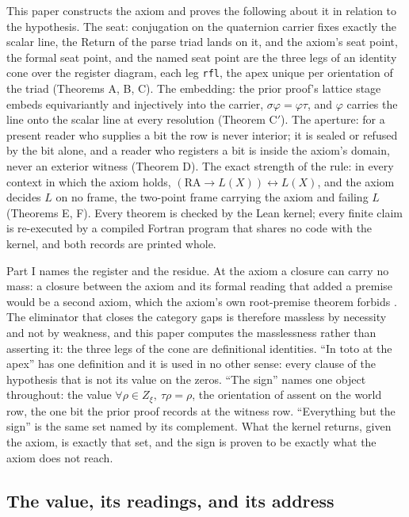 \documentclass[10pt]{article}
\begin{document}
This paper constructs the axiom and proves the following about it in
relation to the hypothesis. The seat: conjugation on the quaternion
carrier fixes exactly the scalar line, the Return of the parse triad
lands on it, and the axiom's seat point, the formal seat point, and the
named seat point are the three legs of an identity cone over the
register diagram, each leg \texttt{rfl}, the apex unique per orientation
of the triad (Theorems A, B, C). The embedding: the prior proof's
lattice stage embeds equivariantly and injectively into the carrier,
\(\sigma\varphi = \varphi\tau\), and \(\varphi\) carries the line onto
the scalar line at every resolution (Theorem C\('\)). The aperture: for
a present reader who supplies a bit the row is never interior; it is
sealed or refused by the bit alone, and a reader who registers a bit is
inside the axiom's domain, never an exterior witness (Theorem D). The
exact strength of the rule: in every context in which the axiom holds,
\((\mathrm{RA} \to L(X)) \leftrightarrow L(X)\), and the axiom decides
\(L\) on no frame, the two-point frame carrying the axiom and failing
\(L\) (Theorems E, F). Every theorem is checked by the Lean kernel;
every finite claim is re-executed by a compiled Fortran program that
shares no code with the kernel, and both records are printed whole.

Part I names the register and the residue. At the axiom a closure can
carry no mass: a closure between the axiom and its formal reading that
added a premise would be a second axiom, which the axiom's own
root-premise theorem forbids \cite{islamcodex}. The eliminator that
closes the category gaps is therefore massless by necessity and not by
weakness, and this paper computes the masslessness rather than asserting
it: the three legs of the cone are definitional identities. ``In toto at
the apex'' has one definition and it is used in no other sense: every
clause of the hypothesis that is not its value on the zeros. ``The
sign'' names one object throughout: the value
\(\forall \rho \in Z_\xi,\ \tau\rho = \rho\), the orientation of assent
on the world row, the one bit the prior proof records at the witness
row. ``Everything but the sign'' is the same set named by its
complement. What the kernel returns, given the axiom, is exactly that
set, and the sign is proven to be exactly what the axiom does not reach.

\hypertarget{the-value-its-readings-and-its-address}{%
\subsection{The value, its readings, and its
address}\label{the-value-its-readings-and-its-address}}
\end{document}
